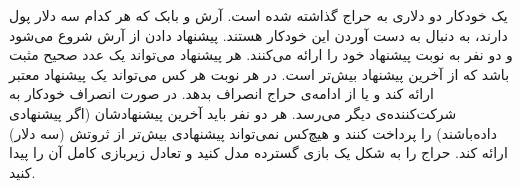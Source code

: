 یک خودکار دو دلاری به حراج گذاشته شده است. آرش و بابک که هر کدام سه دلار پول دارند، به دنبال به دست آوردن این خودکار هستند. پیشنهاد دادن از آرش شروع می‌شود و دو نفر به نوبت پیشنهاد خود را ارائه می‌کنند. هر پیشنهاد می‌تواند یک عدد صحیح مثبت باشد که از آخرین پیشنهاد بیش‌تر است. در هر نوبت هر کس می‌تواند یک پیشنهاد معتبر ارائه کند و یا از ادامه‌ی حراج انصراف بدهد. در صورت انصراف خودکار به شرکت‌کننده‌ی دیگر می‌رسد. هر دو نفر باید آخرین پیشنهادشان (اگر پیشنهادی داده‌باشند) را پرداخت کنند و هیچ‌کس نمی‌تواند پیشنهادی بیش‌تر از ثروتش (سه دلار) ارائه کند. حراج را به شکل یک بازی گسترده مدل کنید و تعادل زیربازی کامل آن را پیدا کنید.

